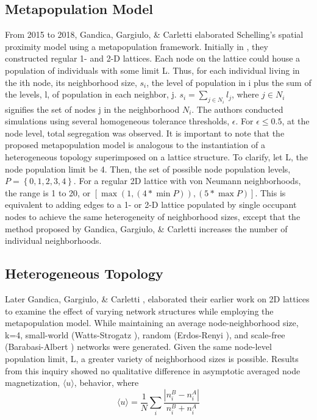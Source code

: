 \documentclass[a4paper]{article}
\begin{document}
\subsection{Metapopulation Model}
From 2015 to 2018, Gandica, Gargiulo, \& Carletti \cite{gandica2016can,GargiuloFloriana2015UsfS}  elaborated Schelling’s spatial proximity model using a metapopulation framework. Initially in \cite{gandica2016can}, they constructed regular 1- and 2-D lattices. Each node on the lattice could house a population of individuals with some limit L. Thus, for each individual living in the ith node, its neighborhood size, $s_i$, the level of population in i plus the sum of the levels, l, of population in each neighbor, j.  $s_i=\sum_{j\in N_i} l_j$, where $j\in N_i$ signifies the set of nodes j in the neighborhood $N_i$. The authors conducted simulations using several homogeneous tolerance thresholds, $\epsilon$. For $\epsilon\le0.5$, at the node level, total segregation was observed. 
It is important to note that the proposed metapopulation model is analogous to the instantiation of a heterogeneous topology superimposed on a lattice structure. To clarify, let L, the node population limit be 4. Then, the set of possible node population levels, $P=\left\{0,1,2,3,4\right\}$. For a regular 2D lattice with von Neumann neighborhoods, the range is 1 to 20, or $[\max(1,(4*\min{P})),(5*\max{P})]$. This is equivalent to adding edges to a 1- or 2-D lattice populated by single occupant nodes to achieve the same heterogeneity of neighborhood sizes, except that the method proposed by Gandica, Gargiulo, \& Carletti increases the number of individual neighborhoods. 


\subsection{Heterogeneous Topology}
Later Gandica, Gargiulo, \& Carletti \cite{GargiuloFloriana2015UsfS}, elaborated their earlier work on 2D lattices to examine the effect of varying network structures while employing the metapopulation model. While maintaining an average node-neighborhood size, k=4, small-world (Watts-Strogatz \cite{Watts1998}), random (Erdos-Renyi \cite{Erdos:1960}), and scale-free (Barabasi-Albert \cite{Barabasi.Albert.74.47}) networks were generated.  Given the same node-level population limit, L, a greater variety of neighborhood sizes is possible. Results from this inquiry showed no qualitative difference in asymptotic averaged node magnetization, $\langle u \rangle$, behavior, where
\begin{equation}
    \langle u \rangle = \frac{1}{N} \sum_{i} \frac{|n_i^B - n_i^A|}{n_i^B + n_i^A}
\end{equation}
\end{document}
